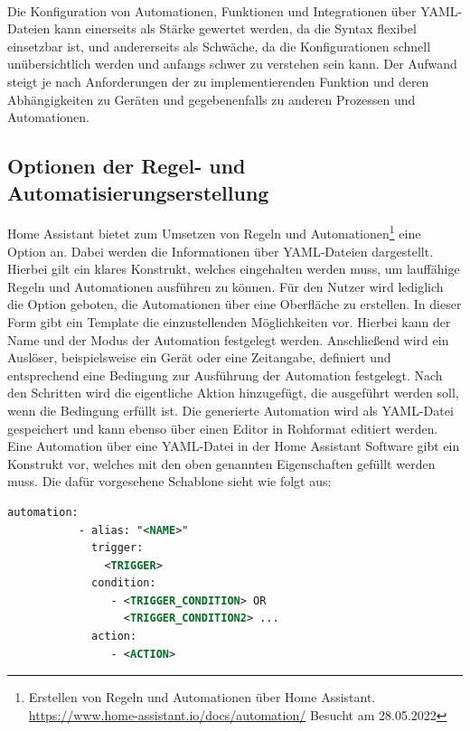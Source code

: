     \\
    Die Konfiguration von Automationen, Funktionen und Integrationen über YAML-Dateien kann einerseits als Stärke gewertet werden, 
    da die Syntax flexibel einsetzbar ist, und 
    andererseits als Schwäche, da die 
    Konfigurationen schnell unübersichtlich werden und anfangs schwer zu verstehen sein kann. Der Aufwand steigt je nach 
    Anforderungen der zu implementierenden Funktion und deren Abhängigkeiten zu Geräten und gegebenenfalls zu anderen 
    Prozessen und Automationen. 

    \subsection{Optionen der Regel- und Automatisierungserstellung}
        Home Assistant bietet zum Umsetzen von Regeln und Automationen\footnote{Erstellen von Regeln und Automationen über Home Assistant. \url{https://www.home-assistant.io/docs/automation/} Besucht am 28.05.2022} 
        eine Option an. Dabei werden die Informationen über 
        YAML-Dateien dargestellt. Hierbei gilt ein klares Konstrukt, welches eingehalten werden muss, um lauffähige Regeln 
        und Automationen ausführen zu können. Für den Nutzer wird lediglich die Option geboten, die Automationen über eine 
        Oberfläche zu erstellen. In dieser Form gibt ein Template die einzustellenden Möglichkeiten vor. Hierbei kann 
        der Name und der Modus der Automation festgelegt werden. Anschließend wird ein Auslöser, beispielsweise ein Gerät 
        oder eine Zeitangabe, definiert und entsprechend eine Bedingung zur Ausführung der Automation festgelegt. Nach den 
        Schritten wird die eigentliche Aktion hinzugefügt, die ausgeführt werden soll, wenn die Bedingung erfüllt ist. Die 
        generierte Automation wird als YAML-Datei gespeichert und kann ebenso über einen Editor in Rohformat editiert werden. 
        Eine Automation über eine YAML-Datei in der Home Assistant Software gibt ein Konstrukt vor, welches mit den oben 
        genannten Eigenschaften gefüllt werden muss. Die dafür vorgesehene Schablone sieht wie folgt aus: 
        \\
        \linebreak
        \begin{lstlisting}[language=xml, frame=lines, xleftmargin=\parindent, style=algoBericht, label={code:YAML}, captionpos=b, caption={Konstrukt zur Regeldefinition über Home Assistant}]
        automation:
           - alias: "<NAME>"
             trigger:
               <TRIGGER>
             condition:
                - <TRIGGER_CONDITION> OR
                  <TRIGGER_CONDITION2> ...
             action:
                - <ACTION>
        \end{lstlisting}

